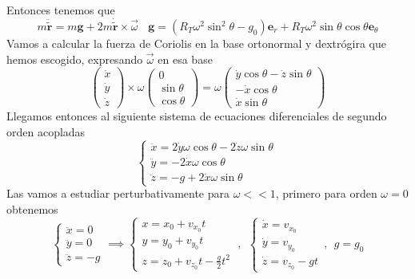 Entonces tenemos que
\begin{equation} \label{6.1.1}
    m\ddot{\tilde{\mathbf{r}}}=  m\mathbf{g} + 2 m \dot{\tilde{\mathbf{r}}} \times  \vec{\omega} \ \ \ \ \mathbf{g} = \left(R_T\omega^2\sin^2\theta-g_0\right) \mathbf{e}_r + R_T\omega^2 \sin \theta \cos \theta \mathbf{e}_\theta 
\end{equation} 
Vamos a calcular la fuerza de Coriolis en la base ortonormal y dextrógira que hemos escogido, expresando $\vec{\omega}$ en esa base
\begin{equation} \label{6.1.1}
    \left(\begin{matrix}
        \dot{x} \\ \dot{y} \\ \dot{z}
    \end{matrix}\right) \times \omega \left(\begin{matrix}
        0 \\  \sin\theta \\ \cos \theta
    \end{matrix}\right) = \omega \left(\begin{matrix}
        \dot{y}\cos\theta -\dot{z}\sin\theta \\  -\dot{x}\cos\theta \\ \dot{x}\sin\theta
    \end{matrix}\right)
\end{equation} 
Llegamos entonces al siguiente sistema de ecuaciones diferenciales de segundo orden acopladas
\begin{equation} \label{6.1.1}
\left\{\begin{matrix}
  \ddot{x} = 2\dot{y}\omega\cos\theta -2\dot{z}\omega\sin\theta\\
  \ddot{y} = -2\dot{x}\omega \cos\theta \phantom{----,,}\\
  \ddot{z} = -g + 2\dot{x}\omega \sin\theta \phantom{---}
\end{matrix}\right.
\end{equation} 
Las vamos a estudiar perturbativamente para $\omega<<1$, primero para orden $\omega = 0$ obtenemos
\begin{equation} \label{6.1.1}
    \left\{\begin{matrix}
      \ddot{x} = 0\\
      \ddot{y} = 0\\
      \ddot{z} = -g
    \end{matrix}\right. \implies
    \left\{\begin{matrix}
        x = x_0 + v_{x_0}t\phantom{--,,}\\
        y = y_0 + v_{y_0}t\phantom{--,,}\\
        z = z_0 + v_{z_0}t-\frac{g}{2}t^2
      \end{matrix}\right. , \ \ 
    \left\{\begin{matrix}
    \dot{x} = v_{x_0}\phantom{--,}\\
    \dot{y} = v_{y_0}\phantom{--,}\\
    \dot{z} = v_{z_0}-gt
    \end{matrix}\right. , \ \ g=g_0
\end{equation} 

